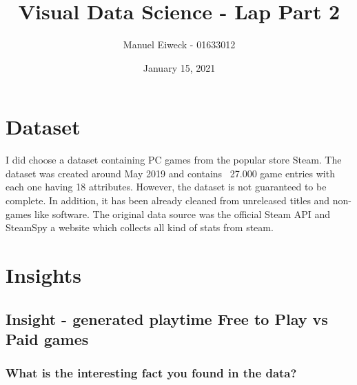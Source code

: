 \documentclass[11pt]{article}
\title{Visual Data Science - Lap Part 2}
\author{Manuel Eiweck - 01633012}
\date{January 15, 2021}
\begin{document}
\maketitle


\section{Dataset}

I did choose a dataset containing PC games from the popular store Steam. The dataset was created around May 2019 and contains ~27.000 game entries with each one having 18 attributes.
However, the dataset is not guaranteed to be complete. In addition, it has been already cleaned from unreleased titles and non-games like software. The original data source was the official Steam API and SteamSpy a website which collects all kind of stats from steam.




\section{Insights}

\subsection{Insight - generated playtime Free to Play vs Paid games}

\subsubsection{What is the interesting fact you found in the data?}
\end{document}
